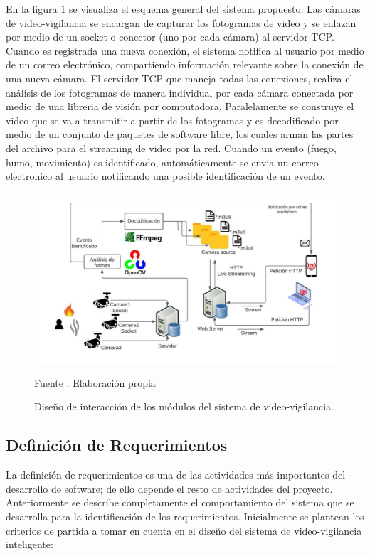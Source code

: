 En la figura \ref{fig:system_desing} se visualiza el esquema general del sistema propuesto. Las cámaras de video-vigilancia se encargan de capturar los fotogramas de video y se enlazan por medio de un socket o conector (uno por cada cámara) al servidor TCP. Cuando es registrada una nueva conexión, el sistema notifica al usuario por medio de un correo electrónico, compartiendo información relevante sobre la conexión de una nueva cámara. El servidor TCP que maneja todas las conexiones, realiza el análisis de los fotogramas de manera individual por cada cámara conectada por medio de una libreria de visión por computadora. Paralelamente se construye el video que se va a transmitir a partir de los fotogramas y es decodificado por medio de un conjunto de paquetes de software libre, los cuales arman las partes del archivo para el streaming de video por la red. Cuando un evento (fuego, humo, movimiento) es identificado, automáticamente se envia un correo electronico al usuario notificando una posible identificación de un evento.\\

\begin{figure}[H]
    \begin{center}
        \includegraphics[width=17cm]{img/capitulo_4/main.jpeg}
        \caption{Diseño de interacción de los módulos del sistema de video-vigilancia.}
        Fuente : Elaboración propia
        \label{fig:system_desing}
    \end{center}
\end{figure}

\subsection{Definición de Requerimientos}
La definición de requerimientos es una de las actividades más importantes del desarrollo de software; de ello depende el resto de actividades del proyecto. Anteriormente se describe completamente el comportamiento del sistema que se desarrolla para la identificación de los requerimientos. Inicialmente se plantean los criterios de partida a tomar en cuenta en el diseño del sistema de video-vigilancia inteligente:


